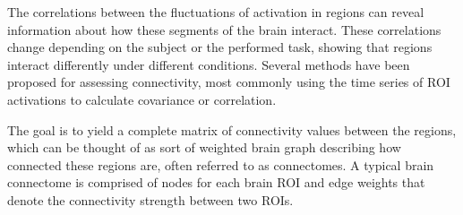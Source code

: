 		The correlations between the fluctuations of activation in regions can reveal information about how these segments of the brain interact. These correlations change depending on the subject or the performed task, showing that regions interact differently under different conditions. Several methods have been proposed for assessing connectivity, most commonly using the time series of ROI activations to calculate covariance or correlation. 
		
		The goal is to yield a complete matrix of connectivity values between the regions, which can be thought of as sort of weighted brain graph describing how connected these regions are, often referred to as connectomes. A typical brain connectome is comprised of nodes for each brain ROI and edge weights that denote the connectivity strength between two ROIs\cite{bassett2017network}.
		
		
